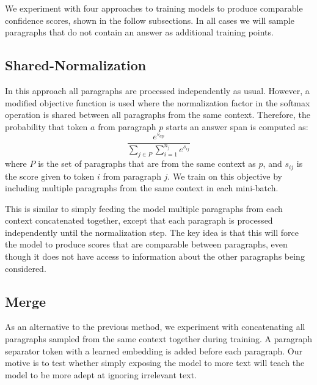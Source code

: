 \documentclass[11pt,a4paper]{article}
\begin{document}
We experiment with four approaches to training models to produce comparable confidence scores, shown in the follow subsections. In all cases we will sample paragraphs that do not contain an answer as additional training points.

\subsection{Shared-Normalization}
In this approach all paragraphs are processed independently as usual. However, a modified objective function is used where the normalization factor in the softmax operation is shared between all paragraphs from the same context. Therefore, the probability that token $a$ from paragraph $p$ starts an answer span is computed as:
%
$$ \frac{e^{s_{ap}}}{\sum_{j \in P} \sum^{n_j}_{i=1} e^{s_{ij}}} $$
%
where $P$ is the set of paragraphs that are from the same context as $p$, and $s_{ij}$ is the score given to token $i$ from paragraph $j$. We train on this objective by including multiple paragraphs from the same context in each mini-batch.

This is similar to simply feeding the model multiple paragraphs from each context concatenated together, except that each paragraph is processed independently until the normalization step. The key idea is that this will force the model to produce scores that are comparable between paragraphs, even though it does not have access to information about the other paragraphs being considered. 

\subsection{Merge}
As an alternative to the previous method, we experiment with concatenating all paragraphs sampled from the same context together during training. A paragraph separator token with a learned embedding is added before each paragraph. Our motive is to test whether simply exposing the model to more text will teach the model to be more adept at ignoring irrelevant text.
\end{document}
